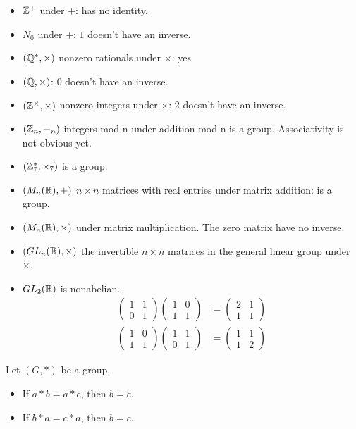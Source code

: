 \documentclass[class=article,crop=false]{standalone}
\begin{document}
\begin{eg}[]
\begin{itemize}
	\item $\mathbb{Z}^+$ under $+$: has no identity.
	\item $N_0$ under  $+$:  $1$ doesn't have an inverse.
	\item  $(\mathbb{Q}^* , \times)$ nonzero rationals under $\times $: yes
	\item $(\mathbb{Q},\times )$: $0$ doesn't have an inverse.
	\item  $(\mathbb{Z}^{\times },\times )$ nonzero integers under $\times $: 2 doesn't have an inverse.
	\item $(\mathbb{Z}_n,+_{n} )$ integers mod n under addition mod n is a group. Associativity is not obvious yet.
	\item $(\mathbb{Z}_7^*,\times_7  )$ is a group.
	\item $(M_n(\mathbb{R}),+)$ $n\times n$ matrices with real entries under matrix addition: is a group.
	\item $(M_n(\mathbb{R}),\times )$ under matrix multiplication. The zero matrix have no inverse.
	\item $(GL_n(\mathbb{R}),\times )$ the invertible $n\times n$ matrices in the general linear group under $\times $.
	\item $GL_2(\mathbb{R})$ is nonabelian. 
		\begin{align*}
			\begin{pmatrix} 1 & 1 \\ 0 & 1 \end{pmatrix} \begin{pmatrix} 1&0\\1&1 \end{pmatrix} &= \begin{pmatrix} 2&1\\1&1 \end{pmatrix}  \\
			\begin{pmatrix} 1&0\\1&1 \end{pmatrix} \begin{pmatrix} 1&1\\0&1 \end{pmatrix}  	&= \begin{pmatrix} 1&1\\1&2 \end{pmatrix}  
		\end{align*}
\end{itemize}

\end{eg}
\begin{thm}[]
	Let $(G,*)$ be a group. 
	\begin{itemize}
		\item If  $a*b=a*c$, then  $b=c$. 
		\item If $b*a=c*a$, then  $b=c$.
	\end{itemize}
\end{thm}
\end{document}
